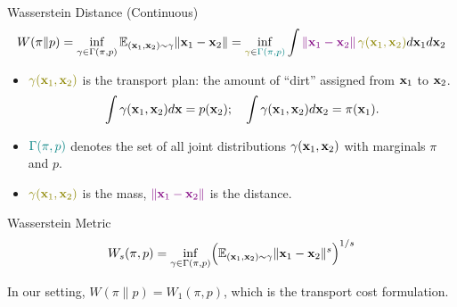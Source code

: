 \documentclass{beamer}
\renewcommand{\eqpause}{}
\begin{document}
\begin{frame}{Wasserstein Distance (Continuous)}
	\vspace{-0.5cm}
	{
	\small
	\[
		W(\pi \| p) = \inf_{\gamma \in \Gamma(\pi, p)} \bbE_{(\bx_1, \bx_2) \sim \gamma} \| \bx_1 - \bx_2 \| =  \inf_{{\color{olive}\gamma} \in {\color{teal}\Gamma(\pi, p)}} \int {\color{violet} \| \bx_1 - \bx_2 \|}\, {\color{olive}\gamma (\bx_1, \bx_2)} d \bx_1 d \bx_2
	\]
	}
	\vspace{-0.4cm}
	\begin{itemize}
		\item ${\color{olive}\gamma (\bx_1, \bx_2)}$ is the transport plan: the amount of “dirt” assigned from $\mathbf{x}_1$ to $\mathbf{x}_2$.
		\vspace{-0.2cm}
		\[
		\int \gamma(\mathbf{x}_1, \mathbf{x}_2) d \mathbf{x} = p(\mathbf{x}_2); \quad \int \gamma(\mathbf{x}_1, \mathbf{x}_2) d \mathbf{x}_2 = \pi(\mathbf{x}_1).
		\]
		\vspace{-0.6cm}
		\item ${\color{teal}\Gamma(\pi, p)}$ denotes the set of all joint distributions $\gamma (\mathbf{x}_1, \mathbf{x}_2)$ with marginals $\pi$ and $p$.
		\item ${\color{olive}\gamma(\bx_1, \bx_2)}$ is the mass, ${\color{violet}\|\mathbf{x}_1 - \mathbf{x}_2\|}$ is the distance.
	\end{itemize}
	\eqpause
	\begin{block}{Wasserstein Metric}
		\vspace{-0.2cm}
		\[
		W_s(\pi, p) = \inf_{\gamma \in \Gamma(\pi, p)} \Bigl(\mathbb{E}_{(\mathbf{x}_1, \mathbf{x}_2) \sim \gamma} \|\mathbf{x}_1 - \mathbf{x}_2\|^s\Bigr)^{1/s}
		\]
		\vspace{-0.4cm}
	\end{block}
	In our setting, $W(\pi \| p) = W_1(\pi, p)$, which is the transport cost formulation.
\end{frame}
\end{document}
